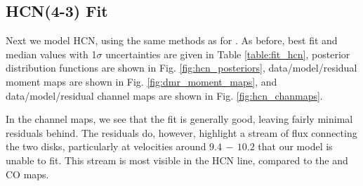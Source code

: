 




\subsection{HCN(4-3) Fit}
\label{subsection:hcn_fit}

Next we model HCN, using the same methods as for \hco. As before, best fit and median values with 1$\sigma$  uncertainties are given in Table \ref{table:fit_hcn}, posterior distribution functions are shown in Fig. \ref{fig:hcn_posteriors}, data/model/residual moment maps are shown in Fig. \ref{fig:dmr_moment_maps}, and data/model/residual channel maps are shown in Fig. \ref{fig:hcn_chanmaps}.

In the channel maps, we see that the fit is generally good, leaving fairly minimal residuals behind. The residuals do, however, highlight a stream of flux connecting the two disks, particularly at velocities around $9.4\,-\,10.2$ \kms that our model is unable to fit. This stream is most visible in the HCN line, compared to the \hco and CO maps.


